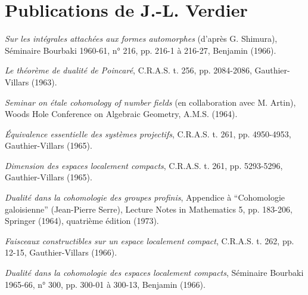 \chapter*{Publications de J.-L. Verdier}

\begin{description}
\item[{[01]}] \emph{Sur les intégrales attachées aux formes automorphes}
(d'après G. Shimura), Séminaire Bourbaki 1960-61, n° 216,
pp. 216-1 à 216-27, Benjamin (1966).

\item[{[02]}] \emph{Le théorème de dualité de Poincaré}, C.R.A.S. t. 256,
pp. 2084-2086, Gauthier-Villars (1963).

\item[{[03]}] \emph{Seminar on étale cohomology of number fields}
(en collaboration avec M. Artin), Woods Hole Conference on Algebraic
Geometry, A.M.S. (1964).

\item[{[04]}] \emph{Équivalence essentielle des systèmes projectifs},
C.R.A.S. t. 261, pp. 4950-4953, Gauthier-Villars (1965).

\item[{[05]}] \emph{Dimension des espaces localement compacts}, C.R.A.S.
t. 261, pp. 5293-5296, Gauthier-Villars (1965).

\item[{[06]}] \emph{Dualité dans la cohomologie des groupes profinis},
Appendice à “Cohomologie galoisienne” (Jean-Pierre Serre), Lecture Notes in
Mathematics 5, pp. 183-206, Springer (1964), quatrième édition (1973).

\item[{[07]}] \emph{Faisceaux constructibles sur un espace localement compact},
C.R.A.S. t. 262, pp. 12-15, Gauthier-Villars (1966).

\item[{[08]}] \emph{Dualité dans la cohomologie des espaces localement
compacts}, Séminaire Bourbaki 1965-66, n° 300, pp. 300-01 à 300-13,
Benjamin (1966).


\end{description}

